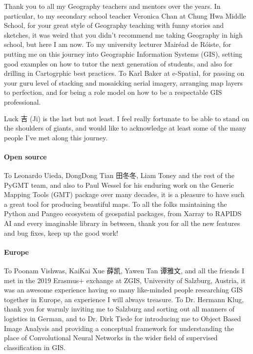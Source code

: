 \documentclass[12pt,twoside]{book}
\begin{document}
\begin{CJK*}{UTF8}{gbsn}
Thank you to all my Geography teachers and mentors over the years.
In particular, to my secondary school teacher Veronica Chan at Chung Hwa Middle School, for your great style of Geography teaching with funny stories and sketches, it was weird that you didn't recommend me taking Geography in high school, but here I am now.
To my university lecturer Mairéad de Róiste, for putting me on this journey into Geographic Information Systems (GIS), setting good examples on how to tutor the next generation of students, and also for drilling in Cartogrphic best practices.
To Karl Baker at e-Spatial, for passing on your guru level of stacking and mosaicking aerial imagery, arranging map layers to perfection, and for being a role model on how to be a respectable GIS professional.

Luck 吉 (Ji) is the last but not least.
I feel really fortunate to be able to stand on the shoulders of giants, and would like to acknowledge at least some of the many people I've met along this journey.

\paragraph{Open source}

To Leonardo Uieda, DongDong Tian 田冬冬, Liam Toney and the rest of the PyGMT team, and also to Paul Wessel for his enduring work on the Generic Mapping Tools (GMT) package over many decades, it is a pleasure to have such a great tool for producing beautiful maps.
To all the folks maintaining the Python and Pangeo ecosystem of geospatial packages, from Xarray to RAPIDS AI and every imaginable library in between, thank you for all the new features and bug fixes, keep up the good work!

\paragraph{Europe}

To Poonam Vishwas, KaiKai Xue 薛凯, Yawen Tan 谭雅文, and all the friends I met in the 2019 Erasmus+ exchange at ZGIS, University of Salzburg, Austria, it was an awesome experience having so many like-minded people researching GIS together in Europe, an experience I will always treasure.
To Dr. Hermann Klug, thank you for warmly inviting me to Salzburg and sorting out all manners of logistics in German, and to Dr. Dirk Tiede for introducing me to Object Based Image Analysis and providing a conceptual framework for understanding the place of Convolutional Neural Networks in the wider field of supervised classification in GIS.


\end{CJK*}
\end{document}
